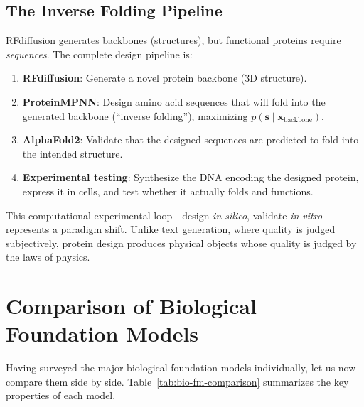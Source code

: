 \subsection{The Inverse Folding Pipeline}

RFdiffusion generates backbones (structures), but functional proteins require \emph{sequences}. The complete design pipeline is:

\begin{enumerate}[leftmargin=1.8em]
  \item \textbf{RFdiffusion}: Generate a novel protein backbone (3D structure).
  \item \textbf{ProteinMPNN}: Design amino acid sequences that will fold into the generated backbone (``inverse folding''), maximizing $p(\mathbf{s} \mid \mathbf{x}_{\mathrm{backbone}})$.
  \item \textbf{AlphaFold2}: Validate that the designed sequences are predicted to fold into the intended structure.
  \item \textbf{Experimental testing}: Synthesize the DNA encoding the designed protein, express it in cells, and test whether it actually folds and functions.
\end{enumerate}

This computational-experimental loop---design \emph{in silico}, validate \emph{in vitro}---represents a paradigm shift. Unlike text generation, where quality is judged subjectively, protein design produces physical objects whose quality is judged by the laws of physics.

\section{Comparison of Biological Foundation Models}
\label{sec:comparison-table}

Having surveyed the major biological foundation models individually, let us now compare them side by side. Table~\ref{tab:bio-fm-comparison} summarizes the key properties of each model.

